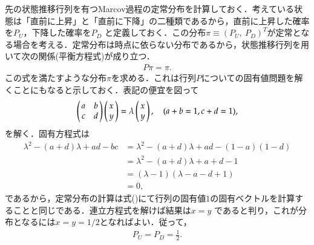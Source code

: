 \documentclass[a4j,papersize,disablejfam,slide,14pt]{jsarticle}
\begin{document}
    先の状態推移行列を有つ{\rm Marcov}過程の定常分布を計算しておく．考えている状態は「直前に上昇」と「直前に下降」の二種類であるから，直前に上昇した確率を$P_U$，下降した確率を$P_D$
    と定義しておく．この分布$\pi \equiv (P_U,\ P_D)^T$が定常となる場合を考える．定常分布は時点に依らない分布であるから，状態推移行列を用いて次の関係(平衡方程式)が成り立つ．
    \begin{align}
    	P \pi = \pi.
    \end{align}
    この式を満たすような分布$\pi$を求める．これは行列$P$についての固有値問題を解くことにもなると示しておく．表記の便宜を図って
    \begin{align}
    	\left(
    	\begin{array}{@{\,}cc@{\,}}
    		a & b \\
            c & d
    	\end{array}
    	\right)
        \left(
    	\begin{array}{@{\,}c@{\,}}
    		x \\
            y
    	\end{array}
    	\right)
        =
        \lambda \left(
    	\begin{array}{@{\,}c@{\,}}
    		x \\
            y
    	\end{array}
    	\right), \quad (a+b=1, c+d=1), \label{eq:balance_equation}
    \end{align}
    を解く．固有方程式は
    \begin{align}
    	\lambda^2 - (a + d)\lambda + ad - bc &= \lambda^2 - (a + d)\lambda + ad - (1-a)(1-d) \\
        &= \lambda^2 - (a + d)\lambda + a + d - 1 \\
        &= (\lambda - 1)(\lambda - a - d + 1) \\
        &= 0,
    \end{align}
    であるから，定常分布の計算は式()にて行列の固有値$1$の固有ベクトルを計算することと同じである．連立方程式を解けば結果は$x=y$
    であると判り，これが分布となるには$x=y=1/2$となればよい．従って，
    \begin{align}
    	P_U = P_D = \frac{1}{2}.
    \end{align}
    
\end{document}

